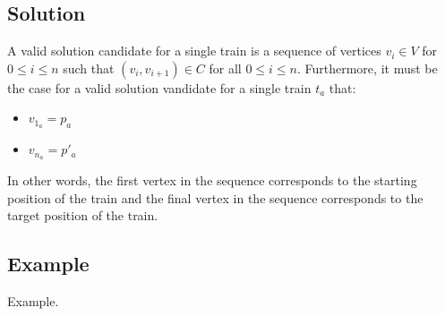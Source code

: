 \subsection{Solution}\label{sec:solution}
A valid solution candidate for a single train is a sequence of vertices $v_i \in V$ for $0 \leq i \leq n$ such that $(v_i,v_{i+1}) \in C$ for all $0 \leq i \leq n$.  Furthermore, it must be the case for a valid solution vandidate for a single train $t_a$ that:
\begin{itemize}
	\item $v_{1_a} = p_a$
	\item $v_{n_a} = p'_a$
\end{itemize}
\noindent In other words, the first vertex in the sequence corresponds to the starting position of the train and the final vertex in the sequence corresponds to the target position of the train.

\subsection{Example}\label{sec:example}
Example.
